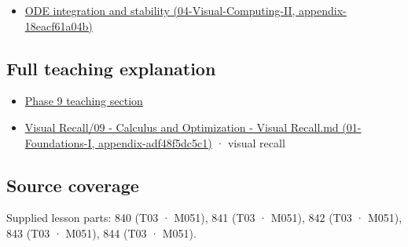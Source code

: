 \begin{itemize}
\tightlist
\item
  \href{../04-Visual-Computing-II/main.pdf\#nameddest=appendix-18eacf61a04b}{ODE integration and stability (04-Visual-Computing-II, appendix-18eacf61a04b)}
\end{itemize}

\subsection{Full teaching explanation}\label{appendix-8f96f9c4d5bc-full-teaching-explanation}

\begin{itemize}
\tightlist
\item
  \hyperref[02-foundations-ii-ch025-odes-and-numerical-simulation]{Phase 9 teaching section}
\item
  \href{../01-Foundations-I/main.pdf\#nameddest=appendix-adf48f5dc5c1}{Visual Recall/09 - Calculus and Optimization - Visual Recall.md (01-Foundations-I, appendix-adf48f5dc5c1)} · visual recall
\end{itemize}

\subsection{Source coverage}\label{appendix-8f96f9c4d5bc-source-coverage}

Supplied lesson parts: 840 (T03 · M051), 841 (T03 · M051), 842 (T03 · M051), 843 (T03 · M051), 844 (T03 · M051).
